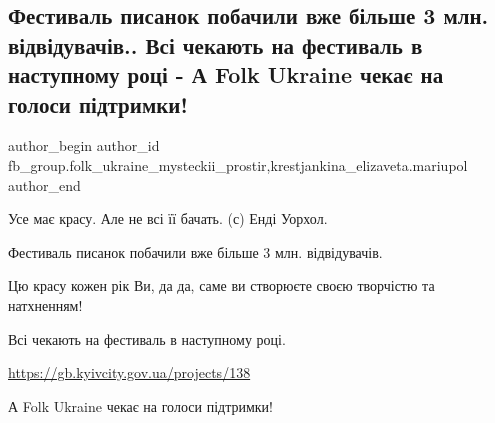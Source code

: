 
 
 
 
 

\subsection{Фестиваль писанок побачили вже більше 3 млн. відвідувачів.. Всі чекають на фестиваль в наступному році - А Folk Ukraine чекає на голоси підтримки!}
\label{sec:17_06_2018.fb.fb_group.folk_ukraine_mysteckii_prostir.1.festival_pysanky_kyiv_pidtrymka_folk_ukraine}
 
\ifcmt
 author_begin
   author_id fb_group.folk_ukraine_mysteckii_prostir,krestjankina_elizaveta.mariupol
 author_end
\fi

Усе має красу. Але не всі її бачать. (с) Енді Уорхол.

Фестиваль писанок побачили вже більше 3 млн. відвідувачів.

Цю красу кожен рік Ви, да да, саме ви створюєте своєю творчістю та натхненням!

Всі чекають на фестиваль в наступному році.

\url{https://gb.kyivcity.gov.ua/projects/138}

А Folk Ukraine чекає на голоси підтримки!
